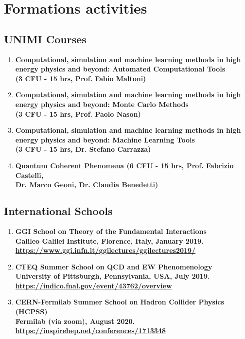 \documentclass[12pt]{article}
\begin{document}
\newpage

\section{Formations activities}

\subsection{UNIMI Courses}

\begin{enumerate}{\leftmargin 15pt \itemsep 0pt \topsep 3pt}
	\item{\bf Computational, simulation and machine learning methods in high energy physics and beyond: Automated Computational Tools \\(3 CFU - 15 hrs, Prof. Fabio Maltoni)}
	\item{\bf Computational, simulation and machine learning methods in high energy physics and beyond: Monte Carlo Methods \\(3 CFU - 15 hrs, Prof. Paolo Nason)}
	\item{\bf Computational, simulation and machine learning methods in high energy physics and beyond: Machine Learning Tools \\(3 CFU - 15 hrs, Dr. Stefano Carrazza)}
	\item{\bf Quantum Coherent Phenomena (6 CFU - 15 hrs, Prof. Fabrizio Castelli, \\Dr. Marco Geoni, Dr. Claudia Benedetti)}
\end{enumerate}

\subsection{International Schools}

\begin{enumerate}{\leftmargin 15pt \itemsep 0pt \topsep 3pt}
	\item{\bf GGI School on Theory of the Fundamental Interactions \\Galileo Galilei Institute, Florence, Italy, January 2019. \\ \href{https://www.ggi.infn.it/ggilectures/ggilectures2019/}{https://www.ggi.infn.it/ggilectures/ggilectures2019/}}
	\item{\bf CTEQ Summer School on QCD and EW Phenomenology \\University of Pittsburgh, Pennsylvania, USA, July 2019. \\ \href{https://indico.fnal.gov/event/43762/overview}{https://indico.fnal.gov/event/43762/overview}}
	\item{\bf CERN-Fermilab Summer School on Hadron Collider Physics (HCPSS) \\Fermilab (via zoom), August 2020. \\ \href{https://inspirehep.net/conferences/1713348}{https://inspirehep.net/conferences/1713348}}
\end{enumerate}
\end{document}
